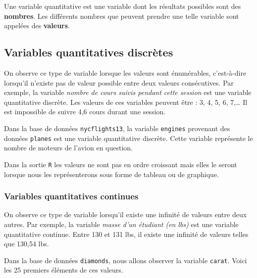\documentclass[]{book}
\newenvironment{Shaded}{\begin{snugshade}}{\end{snugshade}}
\newcommand{\KeywordTok}[1]{\textcolor[rgb]{0.13,0.29,0.53}{\textbf{#1}}}
\newcommand{\NormalTok}[1]{#1}
\newcommand{\OperatorTok}[1]{\textcolor[rgb]{0.81,0.36,0.00}{\textbf{#1}}}
\theoremstyle{definition}
\theoremstyle{definition}
\theoremstyle{definition}
\theoremstyle{remark}
\begin{document}
Une variable quantitative est une variable dont les résultats possibles
sont des \textbf{nombres}. Les différents nombres que peuvent prendre
une telle variable sont appelées des \textbf{valeurs}.

\hypertarget{variables-quantitatives-discretes}{%
\subsection{Variables quantitatives
discrètes}\label{variables-quantitatives-discretes}}

On observe ce type de variable lorsque les valeurs sont énumérables,
c'est-à-dire lorsqu'il n'existe pas de valeur possible entre deux
valeurs consécutives. Par exemple, la variable \emph{nombre de cours
suivis pendant cette session} est une variable quantitative discrète.
Les valeurs de ces variables peuvent être : 3, 4, 5, 6, 7,\ldots{} Il
est impossible de suivre 4,6 cours durant une session.

Dans la base de données \texttt{nycflights13}, la variable
\texttt{engines} provenant des données \texttt{planes} est une variable
quantitative discrète. Cette variable représente le nombre de moteurs de
l'avion en question.

\begin{Shaded}
\end{Shaded}

Dans la sortie \texttt{R} les valeurs ne sont pas en ordre croissant
mais elles le seront lorsque nous les représenterons sous forme de
tableau ou de graphique.

\hypertarget{variables-quantitatives-continues}{%
\subsubsection{Variables quantitatives
continues}\label{variables-quantitatives-continues}}

On observe ce type de variable lorsqu'il existe une infinité de valeurs
entre deux autres. Par exemple, la variable \emph{masse d'un étudiant
(en lbs)} est une variable quantitative continue. Entre 130 et 131 lbs,
il existe une infinité de valeurs telles que 130,54 lbs.

Dans la base de données \texttt{diamonds}, nous allons observer la
variable \texttt{carat}. Voici les 25 premiers éléments de ces valeurs.
\end{document}
